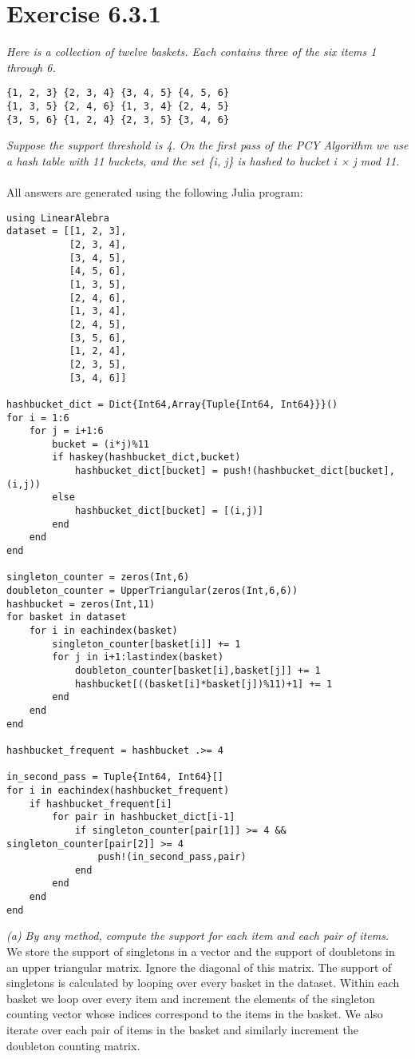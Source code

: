 \documentclass{article}
\begin{document}
\section*{Exercise 6.3.1}
\textit{Here is a collection of twelve baskets. Each contains three of
the six items 1 through 6.}
\begin{verbatim}
{1, 2, 3} {2, 3, 4} {3, 4, 5} {4, 5, 6}
{1, 3, 5} {2, 4, 6} {1, 3, 4} {2, 4, 5}
{3, 5, 6} {1, 2, 4} {2, 3, 5} {3, 4, 6}
\end{verbatim}
\textit{Suppose the support threshold is 4. On the first pass of the PCY Algorithm
we use a hash table with 11 buckets, and the set \{i, j\} is hashed to bucket i × j
mod 11.}
\\
\\
All answers are generated using the following Julia program:
\begin{verbatim}
using LinearAlebra
dataset = [[1, 2, 3],
           [2, 3, 4],
           [3, 4, 5],
           [4, 5, 6],
           [1, 3, 5],
           [2, 4, 6],
           [1, 3, 4],
           [2, 4, 5],
           [3, 5, 6],
           [1, 2, 4],
           [2, 3, 5],
           [3, 4, 6]]

hashbucket_dict = Dict{Int64,Array{Tuple{Int64, Int64}}}()
for i = 1:6
    for j = i+1:6
        bucket = (i*j)%11
        if haskey(hashbucket_dict,bucket)
            hashbucket_dict[bucket] = push!(hashbucket_dict[bucket],(i,j))
        else
            hashbucket_dict[bucket] = [(i,j)]
        end
    end
end

singleton_counter = zeros(Int,6)
doubleton_counter = UpperTriangular(zeros(Int,6,6))
hashbucket = zeros(Int,11)
for basket in dataset
    for i in eachindex(basket)
        singleton_counter[basket[i]] += 1
        for j in i+1:lastindex(basket)
            doubleton_counter[basket[i],basket[j]] += 1
            hashbucket[((basket[i]*basket[j])%11)+1] += 1
        end
    end
end

hashbucket_frequent = hashbucket .>= 4

in_second_pass = Tuple{Int64, Int64}[]
for i in eachindex(hashbucket_frequent)
    if hashbucket_frequent[i]
        for pair in hashbucket_dict[i-1]
            if singleton_counter[pair[1]] >= 4 && singleton_counter[pair[2]] >= 4
                push!(in_second_pass,pair)
            end
        end
    end
end
\end{verbatim}
\textit{(a) By any method, compute the support for each item and each pair of items.}
\\
We store the support of singletons in a vector and the support of doubletons in an  upper triangular matrix. Ignore the diagonal of this matrix. The support of singletons is calculated by looping over every basket in the dataset. Within each basket we loop over every item and increment the elements of the singleton counting vector whose indices correspond to the items in the basket. We also iterate over each pair of items in the basket and similarly increment the doubleton counting matrix.
\end{document}
